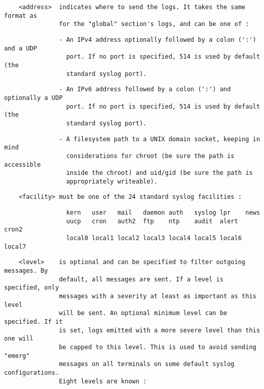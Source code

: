 \begin{verbatim}
    <address>  indicates where to send the logs. It takes the same format as
               for the "global" section's logs, and can be one of :
\end{verbatim}

\begin{verbatim}
               - An IPv4 address optionally followed by a colon (':') and a UDP
                 port. If no port is specified, 514 is used by default (the
                 standard syslog port).
\end{verbatim}

\begin{verbatim}
               - An IPv6 address followed by a colon (':') and optionally a UDP
                 port. If no port is specified, 514 is used by default (the
                 standard syslog port).
\end{verbatim}

\begin{verbatim}
               - A filesystem path to a UNIX domain socket, keeping in mind
                 considerations for chroot (be sure the path is accessible
                 inside the chroot) and uid/gid (be sure the path is
                 appropriately writeable).
\end{verbatim}

\begin{verbatim}
    <facility> must be one of the 24 standard syslog facilities :
\end{verbatim}

\begin{verbatim}
                 kern   user   mail   daemon auth   syslog lpr    news
                 uucp   cron   auth2  ftp    ntp    audit  alert  cron2
                 local0 local1 local2 local3 local4 local5 local6 local7
\end{verbatim}

\begin{verbatim}
    <level>    is optional and can be specified to filter outgoing messages. By
               default, all messages are sent. If a level is specified, only
               messages with a severity at least as important as this level
               will be sent. An optional minimum level can be specified. If it
               is set, logs emitted with a more severe level than this one will
               be capped to this level. This is used to avoid sending "emerg"
               messages on all terminals on some default syslog configurations.
               Eight levels are known :
\end{verbatim}

